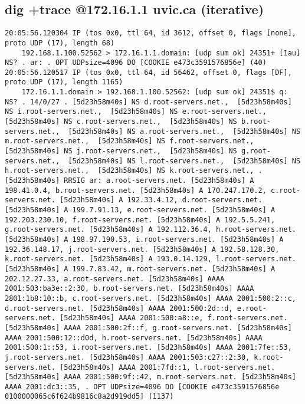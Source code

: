 \documentclass{article}
\begin{document}
\subsection{dig +trace @172.16.1.1 uvic.ca (iterative)}
{\scriptsize
\begin{lstlisting}
20:05:56.120304 IP (tos 0x0, ttl 64, id 3612, offset 0, flags [none], proto UDP (17), length 68)
    192.168.1.100.52562 > 172.16.1.1.domain: [udp sum ok] 24351+ [1au] NS? . ar: . OPT UDPsize=4096 DO [COOKIE e473c3591576856e] (40)
20:05:56.120517 IP (tos 0x0, ttl 64, id 56462, offset 0, flags [DF], proto UDP (17), length 1165)
    172.16.1.1.domain > 192.168.1.100.52562: [udp sum ok] 24351$ q: NS? . 14/0/27 . [5d23h58m40s] NS d.root-servers.net.,  [5d23h58m40s] NS i.root-servers.net.,  [5d23h58m40s] NS e.root-servers.net.,  [5d23h58m40s] NS c.root-servers.net.,  [5d23h58m40s] NS b.root-servers.net.,  [5d23h58m40s] NS a.root-servers.net.,  [5d23h58m40s] NS m.root-servers.net.,  [5d23h58m40s] NS f.root-servers.net.,  [5d23h58m40s] NS j.root-servers.net.,  [5d23h58m40s] NS g.root-servers.net.,  [5d23h58m40s] NS l.root-servers.net.,  [5d23h58m40s] NS h.root-servers.net.,  [5d23h58m40s] NS k.root-servers.net., . [5d23h58m40s] RRSIG ar: a.root-servers.net. [5d23h58m40s] A 198.41.0.4, b.root-servers.net. [5d23h58m40s] A 170.247.170.2, c.root-servers.net. [5d23h58m40s] A 192.33.4.12, d.root-servers.net. [5d23h58m40s] A 199.7.91.13, e.root-servers.net. [5d23h58m40s] A 192.203.230.10, f.root-servers.net. [5d23h58m40s] A 192.5.5.241, g.root-servers.net. [5d23h58m40s] A 192.112.36.4, h.root-servers.net. [5d23h58m40s] A 198.97.190.53, i.root-servers.net. [5d23h58m40s] A 192.36.148.17, j.root-servers.net. [5d23h58m40s] A 192.58.128.30, k.root-servers.net. [5d23h58m40s] A 193.0.14.129, l.root-servers.net. [5d23h58m40s] A 199.7.83.42, m.root-servers.net. [5d23h58m40s] A 202.12.27.33, a.root-servers.net. [5d23h58m40s] AAAA 2001:503:ba3e::2:30, b.root-servers.net. [5d23h58m40s] AAAA 2801:1b8:10::b, c.root-servers.net. [5d23h58m40s] AAAA 2001:500:2::c, d.root-servers.net. [5d23h58m40s] AAAA 2001:500:2d::d, e.root-servers.net. [5d23h58m40s] AAAA 2001:500:a8::e, f.root-servers.net. [5d23h58m40s] AAAA 2001:500:2f::f, g.root-servers.net. [5d23h58m40s] AAAA 2001:500:12::d0d, h.root-servers.net. [5d23h58m40s] AAAA 2001:500:1::53, i.root-servers.net. [5d23h58m40s] AAAA 2001:7fe::53, j.root-servers.net. [5d23h58m40s] AAAA 2001:503:c27::2:30, k.root-servers.net. [5d23h58m40s] AAAA 2001:7fd::1, l.root-servers.net. [5d23h58m40s] AAAA 2001:500:9f::42, m.root-servers.net. [5d23h58m40s] AAAA 2001:dc3::35, . OPT UDPsize=4096 DO [COOKIE e473c3591576856e 0100000065c6f624b9816c8a2d919dd5] (1137)

\end{lstlisting}}
\end{document}
